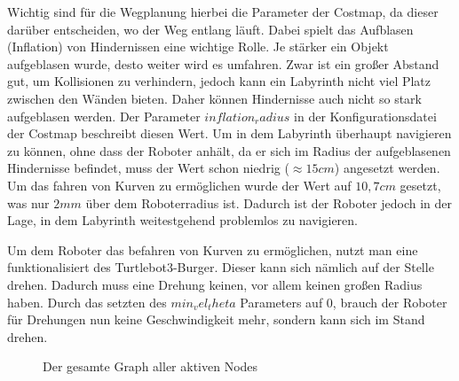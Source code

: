 {{			
			Wichtig sind für die Wegplanung hierbei die Parameter der Costmap, da dieser darüber entscheiden, wo der Weg entlang läuft. Dabei spielt das Aufblasen (Inflation) von Hindernissen eine wichtige Rolle. Je stärker ein Objekt aufgeblasen wurde, desto weiter wird es umfahren. Zwar ist ein großer Abstand gut, um Kollisionen zu verhindern, jedoch kann ein Labyrinth nicht viel Platz zwischen den Wänden bieten. Daher können Hindernisse auch nicht so stark aufgeblasen werden. Der Parameter $inflation_radius$ in der Konfigurationsdatei der Costmap beschreibt diesen Wert. Um in dem Labyrinth überhaupt navigieren zu können, ohne dass der Roboter anhält, da er sich im Radius der aufgeblasenen Hindernisse befindet, muss der Wert schon niedrig ($\approx 15\si{cm}$) angesetzt werden. Um das fahren von Kurven zu ermöglichen wurde der Wert auf $10,7 \si{cm}$ gesetzt, was nur $2 \si{mm}$ über dem Roboterradius ist. Dadurch ist der Roboter jedoch in der Lage, in dem Labyrinth weitestgehend problemlos zu navigieren.
			
			Um dem Roboter das befahren von Kurven zu ermöglichen, nutzt man eine funktionalisiert des Turtlebot3-Burger. Dieser kann sich nämlich auf der Stelle drehen. Dadurch muss eine Drehung keinen, vor allem keinen großen Radius haben. Durch das setzten des $min_vel_theta$ Parameters auf $0$, brauch der Roboter für Drehungen nun keine Geschwindigkeit mehr, sondern kann sich im Stand drehen.
			
			\begin{landscape}
				\begin{figure}[htbp]
					\centering
					\caption[short]{Der gesamte Graph aller aktiven Nodes}
					\label{pic:rosgfullfront}
				\end{figure}
			\end{landscape}

			
			
		}
}	